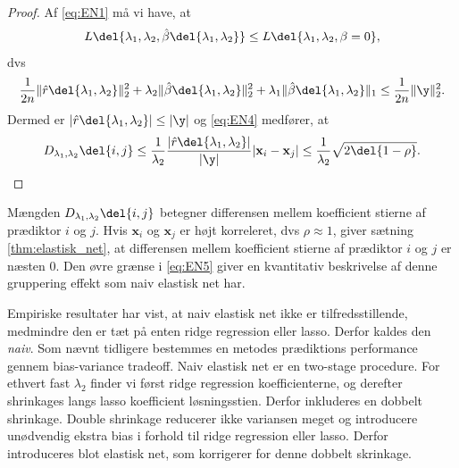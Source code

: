 \begin{proof}
Af \eqref{eq:EN1} må vi have, at
\begin{align*}
L \del{\lambda_1,\lambda_2, \hat{\beta}\del{\lambda_1, \lambda_2}} \leq L \del{\lambda_1,\lambda_2, \beta = 0},  
\end{align*}
dvs
\begin{align*}
\frac{1}{2n} \Vert \hat{r} \del{\lambda_1, \lambda_2} \Vert_2^2 + \lambda_2 \Vert \hat{\beta} \del{\lambda_1, \lambda_2} \Vert_2^2 + \lambda_1 \Vert \hat{\beta} \del{\lambda_1, \lambda_2} \Vert_1 \leq \frac{1}{2n} \Vert \y \Vert_2^2.  
\end{align*}
Dermed er \(\vert \hat{r} \del{\lambda_1, \lambda_2} \vert \leq \vert \y \vert\) og \eqref{eq:EN4} medfører, at
\begin{align*}
D_{\lambda_1, \lambda_2} \del{i,j} \leq \frac{1}{\lambda_2} \frac{\vert \hat{r} \del{\lambda_1, \lambda_2} \vert}{\vert \y \vert} \vert \mathbf{x}_i - \mathbf{x}_j \vert  \leq \frac{1}{\lambda_2} \sqrt{2 \del{1-\rho}}.
\end{align*}
\end{proof}
Mængden \(D_{\lambda_1, \lambda_2} \del{i,j}\) betegner differensen mellem koefficient stierne af prædiktor \(i\) og \(j\).
Hvis \(\mathbf{x}_i\) og \(\mathbf{x}_j\) er højt korreleret, dvs \(\rho \approx 1\), giver sætning \ref{thm:elastisk_net}, at differensen mellem koefficient stierne af prædiktor \(i\) og \(j\) er næsten 0.
Den øvre grænse i \eqref{eq:EN5} giver en kvantitativ beskrivelse af denne gruppering effekt som naiv elastisk net har.

Empiriske resultater har vist, at naiv elastisk net ikke er tilfredsstillende, medmindre den er tæt på enten ridge regression eller lasso.
Derfor kaldes den \textit{naiv}.
Som nævnt tidligere bestemmes en metodes prædiktions performance gennem bias-variance tradeoff. 
Naiv elastisk net er en two-stage procedure. For ethvert fast \(\lambda_2\) finder vi først ridge regression koefficienterne, og derefter shrinkages langs lasso koefficient løsningsstien. Derfor inkluderes en dobbelt shrinkage.
Double shrinkage reducerer ikke variansen meget og introducere unødvendig ekstra bias i forhold til ridge regression eller lasso.
Derfor introduceres blot elastisk net, som korrigerer for denne dobbelt skrinkage.

